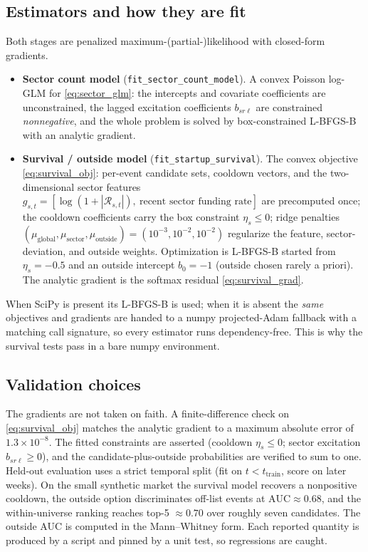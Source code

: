 \documentclass[11pt]{article}
\theoremstyle{plain}
\theoremstyle{definition}
\theoremstyle{remark}
\newcommand{\cR}{\mathcal{R}}
\newcommand{\code}[1]{\texttt{#1}}
\begin{document}
\subsection{Estimators and how they are fit}
Both stages are penalized maximum-(partial-)likelihood with closed-form gradients.
\begin{itemize}[leftmargin=1.5em,itemsep=2pt]
\item \textbf{Sector count model} (\code{fit\_sector\_count\_model}). A convex Poisson log-GLM for \eqref{eq:sector_glm}: the intercepts and covariate coefficients are unconstrained, the lagged excitation coefficients $b_{sr\ell}$ are constrained \emph{nonnegative}, and the whole problem is solved by box-constrained L-BFGS-B with an analytic gradient.
\item \textbf{Survival / outside model} (\code{fit\_startup\_survival}). The convex objective \eqref{eq:survival_obj}: per-event candidate sets, cooldown vectors, and the two-dimensional sector features $g_{s,t}=[\log(1+|\cR_{s,t}|),\ \text{recent sector funding rate}]$ are precomputed once; the cooldown coefficients carry the box constraint $\eta_s\le0$; ridge penalties $(\mu_{\text{global}},\mu_{\text{sector}},\mu_{\text{outside}})=(10^{-3},10^{-2},10^{-2})$ regularize the feature, sector-deviation, and outside weights. Optimization is L-BFGS-B started from $\eta_s=-0.5$ and an outside intercept $b_0=-1$ (outside chosen rarely a priori). The analytic gradient is the softmax residual \eqref{eq:survival_grad}.
\end{itemize}
When SciPy is present its L-BFGS-B is used; when it is absent the \emph{same} objectives and gradients are handed to a numpy projected-Adam fallback with a matching call signature, so every estimator runs dependency-free. This is why the survival tests pass in a bare numpy environment.

\subsection{Validation choices}
The gradients are not taken on faith. A finite-difference check on \eqref{eq:survival_obj} matches the analytic gradient to a maximum absolute error of $1.3\times10^{-8}$. The fitted constraints are asserted (cooldown $\eta_s\le0$; sector excitation $b_{sr\ell}\ge0$), and the candidate-plus-outside probabilities are verified to sum to one. Held-out evaluation uses a strict temporal split (fit on $t<t_{\text{train}}$, score on later weeks). On the small synthetic market the survival model recovers a nonpositive cooldown, the outside option discriminates off-list events at $\mathrm{AUC}\approx0.68$, and the within-universe ranking reaches top-5 $\approx0.70$ over roughly seven candidates. The outside AUC is computed in the Mann--Whitney form. Each reported quantity is produced by a script and pinned by a unit test, so regressions are caught.
\end{document}
